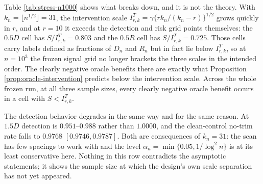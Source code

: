 \documentclass[11pt]{article}
\begin{document}
Table \ref{tab:stress-n1000} shows what breaks down, and it is not the theory.
With $k_n=\lfloor n^{1/2}\rfloor=31$, the intervention scale
$I^{T}_{r,k}=\gamma\{rk_n/(k_n-r)\}^{1/2}$ grows quickly in $r$, and at $r=10$ it
exceeds the detection and risk grid points themselves: the $0.5D$ cell has
$S/I^{T}_{r,k}=0.803$ and the $0.5R$ cell has $S/I^{T}_{r,k}=0.725$.  Those cells carry
labels defined as fractions of $D_n$ and $R_n$ but in fact lie below
$I^{T}_{r,k}$, so at $n=10^3$ the frozen signal grid no longer brackets the three
scales in the intended order.  The clearly negative oracle benefits there
are exactly what Proposition \ref{prop:oracle-intervention} predicts below the
intervention scale.  Across the whole frozen run, at all three sample sizes,
every clearly negative oracle benefit occurs in a cell with $S<I^{T}_{r,k}$.

The detection behavior degrades in the same way and for the same reason.  At
$1.5D$ detection is $0.951$--$0.988$ rather than $1.0000$, and the clean-control
no-trim rate falls to $0.9768$ $[0.9746,0.9787]$.  Both are consequences of
$k_n=31$: the scan has few spacings to work with and the level
$\alpha_n=\min\{0.05,1/\log^2n\}$ is at its least conservative here.  Nothing in
this row contradicts the asymptotic statements; it shows the sample size at
which the design's own scale separation has not yet appeared.







\FloatBarrier
\end{document}
